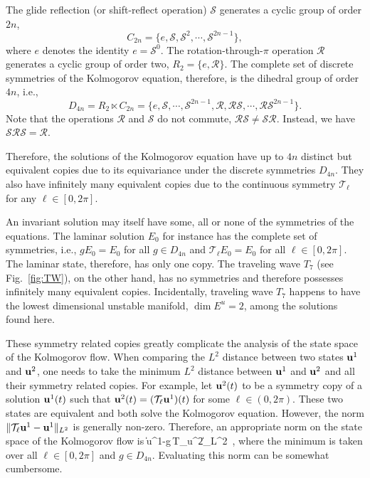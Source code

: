 \documentclass{article}
\begin{document}
The glide reflection (or shift-reflect operation) $\mathcal S$ generates a cyclic group of order $2n$,
$$C_{2n}=\{e,\mathcal S,\mathcal S^2,\cdots,\mathcal S^{2n-1}\},$$
where $e$ denotes the
identity $e=\mathcal S^0$.
The rotation-through-$\pi$ operation $\mathcal R$ generates
a cyclic group of order two, $R_2=\{e,\mathcal R\}$. The complete set of discrete symmetries
of the Kolmogorov equation, therefore, is the dihedral group of order $4n$, i.e.,
$$D_{4n}=R_2\ltimes C_{2n}=\{e,\mathcal S,\cdots, \mathcal S^{2n-1},
\mathcal R,\mathcal R\mathcal S,\cdots,\mathcal R\mathcal S^{2n-1} \}.$$
Note that the operations $\mathcal R$ and $\mathcal S$ do not commute,
$\mathcal R\mathcal S\neq \mathcal S\mathcal R$. Instead, we have
$\mathcal S\mathcal R\mathcal S=\mathcal R$.

Therefore, the solutions of the Kolmogorov equation have up to $4n$ distinct but
equivalent copies due to its equivariance under the discrete symmetries $D_{4n}$.
They also have infinitely many equivalent copies due to the continuous symmetry
$\mathcal T_\ell$ for any $\ell\in[0,2\pi]$.

An invariant solution may itself have some, all or none of the symmetries of the equations.
The laminar solution $E_0$ for instance has the complete set of symmetries, i.e., $gE_0=E_0$ for
all $g\in D_{4n}$ and $\mathcal T_\ell E_0=E_0$ for all $\ell\in[0,2\pi]$. The
laminar state, therefore, has only one copy.
The traveling wave $T_7$ (see Fig.~\ref{fig:TW}), on the other hand, has no symmetries and therefore
possesses infinitely many equivalent copies. Incidentally, traveling wave $T_7$ happens to have the
lowest dimensional unstable manifold, $\dim E^u=2$, among the solutions found here.

These symmetry related copies greatly complicate the analysis of the state space of the Kolmogorov
flow. When comparing the $L^2$ distance between two states $\mathbf u^1$ and $\mathbf u^2$,
one needs to take the minimum $L^2$ distance between $\mathbf u^1$ and $\mathbf u^2$ and all their symmetry
related copies. For example, let $\mathbf u^2(t)$ to be a symmetry copy of
a solution $\mathbf u^1(t)$ such that
$\mathbf u^2(t)=(\mathcal T_\ell\mathbf u^1)(t)$ for some $\ell\in(0,2\pi)$. These two
states are equivalent and
both solve the Kolmogorov equation. However, the norm $\|\mathcal T_\ell\mathbf u^1-\mathbf u^1\|_{L^2}$ is
generally non-zero. Therefore, an appropriate norm on the state space of the
Kolmogorov flow is
\beq
\min
\|\vc u^1-g\,\mathcal T_{\ell}\vc u^2\|_{L^2}
\,,
\eeq
where the minimum is taken over all $\ell\in[0,2\pi]$ and $g\in D_{4n}$.
Evaluating this norm can be somewhat cumbersome.
\end{document}
